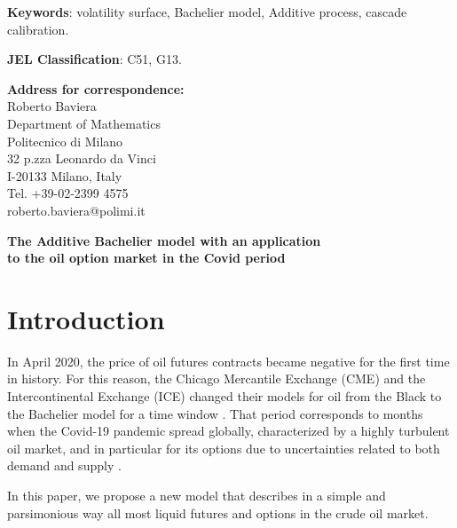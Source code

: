 \documentclass[12pt]{article}
\theoremstyle{definition}
\theoremstyle{remark}
\numberwithin{theorem}{section}
\numberwithin{proposition}{section}
\numberwithin{lemma}{section}
\numberwithin{corollary}{section}
\numberwithin{definition}{section}
\numberwithin{remark}{section}
\numberwithin{example}{section}
\begin{document}
	\vspace*{0.11truein}
	{\bf Keywords}: 
	volatility surface, Bachelier model, Additive process,  cascade calibration.
	\vspace*{0.11truein}
	
	{\bf JEL Classification}: 
	C51, %
	G13. %
	
	\vspace{1.5cm}
	\begin{flushleft}
		{\bf Address for correspondence:}\\
		Roberto Baviera\\
		Department of Mathematics \\
		Politecnico di Milano\\
		32 p.zza Leonardo da Vinci \\ 
		I-20133 Milano, Italy \\
		Tel. +39-02-2399 4575\\
		roberto.baviera@polimi.it
	\end{flushleft}
	
\newpage
\begin{center}
\Large\bfseries 
The Additive Bachelier model with an application \\
 to the oil option market 
 in the Covid period
\end{center}
\section{Introduction}
In April 2020, the price of oil futures contracts became negative for the first time in history.
For this reason, the Chicago
Mercantile Exchange (CME) and the Intercontinental Exchange (ICE) changed their models for
oil %
from the Black to the Bachelier model for a time window %
\citep[][]{CMEGroup,ICE}.
That period 
corresponds to months when the Covid-19 pandemic spread globally, characterized by a highly turbulent oil market, and in particular for its options due to
uncertainties related to both demand and supply \citep{shaikh2021relation}. 

\smallskip

In this paper, we propose a new model that describes in a simple and parsimonious way all most liquid futures and options in the crude oil market.
\end{document}
